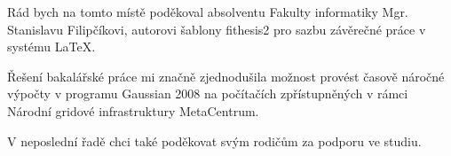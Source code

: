 \documentclass[10pt,draft,oneside]{fithesis2}
\begin{document}

\FrontMatter
\ThesisTitlePage

\begin{ThesisDeclaration}
  \DeclarationText
  \AdvisorName
\end{ThesisDeclaration}

\begin{ThesisThanks}
Rád bych na tomto místě poděkoval absolventu Fakulty informatiky Mgr. Stanislavu Filipčíkovi, autorovi šablony fithesis2 pro sazbu závěrečné práce v systému \LaTeX{}.

Řešení bakalářské práce mi značně zjednodušila možnost provést časově náročné výpočty v programu Gaussian 2008 na počítačích zpřístupněných v rámci Národní gridové infrastruktury MetaCentrum.

V neposlední řadě chci také poděkovat svým rodičům za podporu ve studiu.
\end{ThesisThanks}
\end{document}
